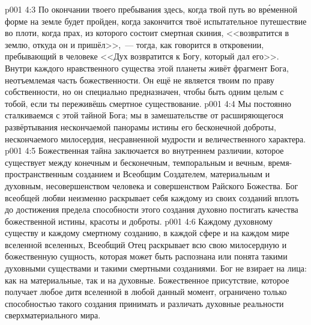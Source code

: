 \vs p001 4:3 По окончании твоего пребывания здесь, когда твой путь во вр\'еменной форме на земле будет пройден, когда закончится твоё испытательное путешествие во плоти, когда прах, из которого состоит смертная скиния, <<возвратится в землю, откуда он и пришёл>>,~--- тогда, как говорится в откровении, пребывающий в человеке <<Дух возвратится к Богу, который дал его>>. Внутри каждого нравственного существа этой планеты живёт фрагмент Бога, неотъемлемая часть божественности. Он ещё не является твоим по праву собственности, но он специально предназначен, чтобы быть одним целым с тобой, если ты переживёшь смертное существование.
\vs p001 4:4 \pc Мы постоянно сталкиваемся с этой тайной Бога; мы в замешательстве от расширяющегося развёртывания нескончаемой панорамы истины его бесконечной доброты, нескончаемого милосердия, несравненной мудрости и величественного характера.
\vs p001 4:5 \pc Божественная тайна заключается во внутреннем различии, которое существует между конечным и бесконечным, темпоральным и вечным, время\hyp{}пространственным созданием и Всеобщим Создателем, материальным и духовным, несовершенством человека и совершенством Райского Божества. Бог всеобщей любви неизменно раскрывает себя каждому из своих созданий вплоть до достижения предела способности этого создания духовно постигать качества божественной истины, красоты и доброты.
\vs p001 4:6 Каждому духовному существу и каждому смертному созданию, в каждой сфере и на каждом мире вселенной вселенных, Всеобщий Отец раскрывает всю свою милосердную и божественную сущность, которая может быть распознана или понята такими духовными существами и такими смертными созданиями. Бог не взирает на лица: как на материальные, так и на духовные. Божественное присутствие, которое получает любое дитя вселенной в любой данный момент, ограничено только способностью такого создания принимать и различать духовные реальности сверхматериального мира.
